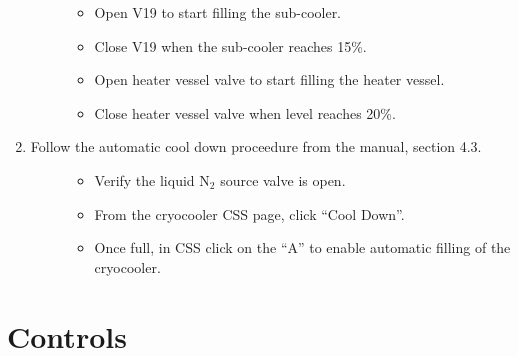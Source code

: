 \documentclass[letterpaper,10pt,english]{sphinxmanual}
\begin{document}
\begin{enumerate}
\begin{description}
\begin{itemize}
\item {} 
Open V19 to start filling the sub-cooler.

\item {} 
Close V19 when the sub-cooler reaches 15\%.

\item {} 
Open heater vessel valve to start filling the heater vessel.

\item {} 
Close heater vessel valve when level reaches 20\%.

\end{itemize}

\end{description}

\item {} \begin{description}
\item[{Follow the automatic cool down proceedure from the manual, section 4.3.}] \leavevmode\begin{itemize}
\item {} 
Verify the liquid N$_{\text{2}}$ source valve is open.

\item {} 
From the cryocooler CSS page, click “Cool Down”.

\item {} 
Once full, in CSS click on the “A” to enable automatic filling of the cryocooler.

\end{itemize}

\end{description}

\end{enumerate}


\section{Controls}
\label{\detokenize{staff:controls}}
\end{document}

